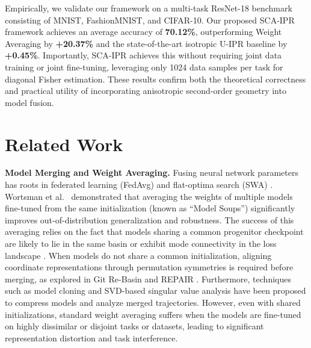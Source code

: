 \documentclass{article}
\theoremstyle{plain}
\theoremstyle{definition}
\theoremstyle{remark}
\begin{document}
Empirically, we validate our framework on a multi-task ResNet-18 benchmark consisting of MNIST, FashionMNIST, and CIFAR-10. 
Our proposed SCA-IPR framework achieves an average accuracy of \textbf{70.12\%}, outperforming Weight Averaging by \textbf{+20.37\%} and the state-of-the-art isotropic U-IPR baseline by \textbf{+0.45\%}. 
Importantly, SCA-IPR achieves this without requiring joint data training or joint fine-tuning, leveraging only 1024 data samples per task for diagonal Fisher estimation. 
These results confirm both the theoretical correctness and practical utility of incorporating anisotropic second-order geometry into model fusion.

\section{Related Work}
\label{submission:related}

\textbf{Model Merging and Weight Averaging.} Fusing neural network parameters has roots in federated learning (FedAvg) \cite{mcmahan2017communication} and flat-optima search (SWA) \cite{izmailov2018averaging}. 
Wortsman et al.\ \cite{wortsman2022model} demonstrated that averaging the weights of multiple models fine-tuned from the same initialization (known as ``Model Soups'') significantly improves out-of-distribution generalization and robustness. 
The success of this averaging relies on the fact that models sharing a common progenitor checkpoint are likely to lie in the same basin or exhibit mode connectivity in the loss landscape \cite{frankle2019lottery, neyshabur2020what, garipov2018loss}.
When models do not share a common initialization, aligning coordinate representations through permutation symmetries is required before merging, as explored in Git Re-Basin \cite{ainsworth2023git} and REPAIR \cite{jordan2023repair}. 
Furthermore, techniques such as model cloning \cite{mucke2023clones} and SVD-based singular value analysis \cite{leclaire2024singular} have been proposed to compress models and analyze merged trajectories.
However, even with shared initializations, standard weight averaging suffers when the models are fine-tuned on highly dissimilar or disjoint tasks or datasets, leading to significant representation distortion and task interference.
\end{document}
